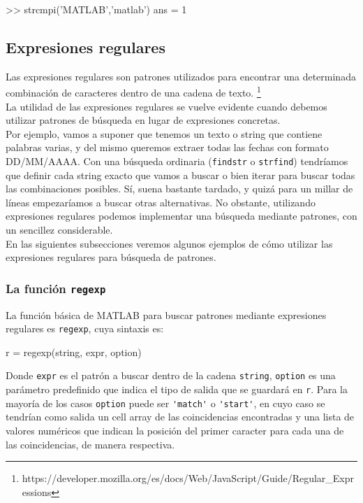 \begin{matlab}
>> strcmpi('MATLAB','matlab')
ans =
     1
\end{matlab}

\subsection{Expresiones regulares}\label{expresiones-regulares}

Las expresiones regulares son patrones utilizados para encontrar una
determinada combinación de caracteres dentro de una cadena de texto.
\footnote{https://developer.mozilla.org/es/docs/Web/JavaScript/Guide/Regular\_Expressions} \\

La utilidad de las expresiones regulares se vuelve evidente cuando
debemos utilizar patrones de búsqueda en lugar de expresiones concretas. \\

Por ejemplo, vamos a suponer que tenemos un texto o string que contiene
palabras varias, y del mismo queremos extraer todas las fechas con
formato DD/MM/AAAA. Con una búsqueda ordinaria (\texttt{findstr} o
\texttt{strfind}) tendríamos que definir cada string exacto que vamos a
buscar o bien iterar para buscar todas las combinaciones posibles. Sí,
suena bastante tardado, y quizá para un millar de líneas empezaríamos a
buscar otras alternativas. No obstante, utilizando expresiones regulares
podemos implementar una búsqueda mediante patrones, con un sencillez
considerable. \\

En las siguientes subsecciones veremos algunos ejemplos de cómo utilizar
las expresiones regulares para búsqueda de patrones.

\subsubsection{La función \texttt{regexp}}\label{la-funciuxf3n-regexp}

La función básica de MATLAB para buscar patrones mediante expresiones
regulares es \texttt{regexp}, cuya sintaxis es:

\begin{matlab}
r = regexp(string, expr, option)
\end{matlab}

Donde \texttt{expr} es el patrón a buscar dentro de la cadena
\texttt{string}, \texttt{option} es una parámetro predefinido que indica
el tipo de salida que se guardará en \texttt{r}. Para la mayoría de los
casos \texttt{option} puede ser
\verb|'match'| o \verb|'start'|, en cuyo caso se
tendrían como salida un cell array de las coincidencias encontradas y
una lista de valores numéricos que indican la posición del primer
caracter para cada una de las coincidencias, de manera respectiva.

